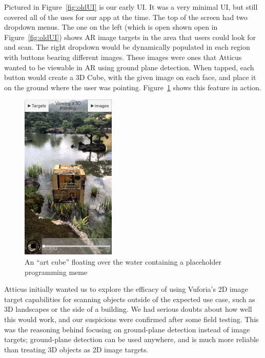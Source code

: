 \documentclass[a4paper, 10pt, american, titlepage]{article}
\begin{document}
Pictured in Figure~\ref{fig:oldUI} is our early UI. It was a very minimal UI,
but still covered all of the uses for our app at the time. The top of the screen
had two dropdown menus. The one on the left (which is open shown open in
Figure~\ref{fig:oldUI}) shows AR image targets in the area that users could
look for and scan. The right dropdown would be dynamically populated in each
region with buttons bearing different images. These images were ones that
Atticus wanted to be viewable in AR using ground plane detection. When tapped,
each button would create a 3D Cube, with the given image on each face, and place
it on the ground where the user was pointing. Figure~\ref{fig:floatingCube}
shows this feature in action.

\begin{figure}[h]
	\centering
	\includegraphics[width=0.4\textwidth]{floating-cube.png}
	\caption{An ``art cube'' floating over the water containing a placeholder
    programming meme}
	\label{fig:floatingCube}
\end{figure}

Atticus initially wanted us to explore the efficacy of using Vuforia's 2D image
target capabilities for scanning objects outside of the expected use case, such
as 3D landscapes or the side of a building. We had serious doubts about how
well this would work, and our suspicions were confirmed after some field
testing. This was the reasoning behind focusing on ground-plane detection
instead of image targets; ground-plane detection can be used anywhere, and is
much more reliable than treating 3D objects as 2D image targets.
\end{document}
